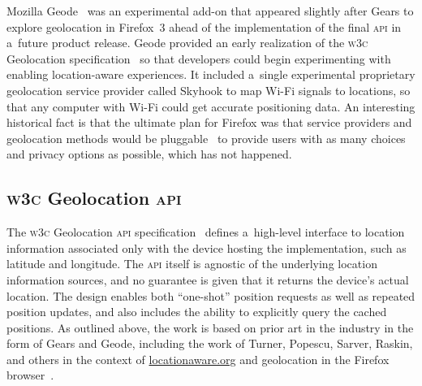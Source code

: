 \documentclass[sigconf,hyphens]{acmart}
\begin{document}
Mozilla Geode~\cite{beard2008geode} was an experimental add-on 
that appeared slightly after Gears to explore geolocation in Firefox~3
ahead of the implementation of the final \textsc{api} in a~future product release.
Geode provided an early realization of the \textsc{w3c} Geolocation
specification~\cite{popescu2016geolocation} so that developers could begin experimenting
with enabling location-aware experiences.
It included a~single experimental proprietary geolocation service provider called Skyhook to map
Wi-Fi signals to locations, so that any computer with Wi-Fi could get accurate positioning data.
An interesting historical fact is that the ultimate plan for Firefox was that service providers
and geolocation methods would be pluggable~\cite{beard2008geode} to provide users
with as many choices and privacy options as possible,
which has not happened.

\subsection{\textsc{w3c} Geolocation \textsc{api}}

The \textsc{w3c} Geolocation \textsc{api} specification~\cite{popescu2016geolocation}
defines a~high-level interface to location information
associated only with the device hosting the implementation, such as latitude and longitude.
The \textsc{api} itself is agnostic of the underlying location information sources,
and no guarantee is given that it returns the device's actual location.
The design enables both ``one-shot'' position requests as well as repeated position updates,
and also includes the ability to explicitly query the cached positions.
As outlined above, the work is based on prior art in the industry in the form of Gears and Geode,
including the work of Turner, Popescu, Sarver, Raskin, and others in the context of
\url{locationaware.org} and geolocation in the Firefox browser~\cite{raskin2010geolocation}.
\end{document}

